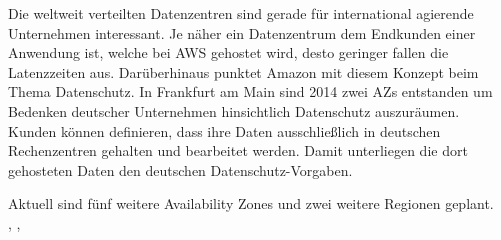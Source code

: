{Die weltweit verteilten Datenzentren sind gerade für international agierende Unternehmen interessant. Je näher ein Datenzentrum dem Endkunden einer Anwendung ist, welche bei AWS gehostet wird, desto geringer fallen die Latenzzeiten aus. Darüberhinaus punktet Amazon mit diesem Konzept beim Thema Datenschutz. In Frankfurt am Main sind 2014 zwei AZs entstanden um Bedenken deutscher Unternehmen hinsichtlich Datenschutz auszuräumen. Kunden können definieren, dass ihre Daten ausschließlich in deutschen Rechenzentren gehalten und bearbeitet werden. Damit unterliegen die dort gehosteten Daten den deutschen Datenschutz-Vorgaben.

Aktuell sind fünf weitere Availability Zones und zwei weitere Regionen geplant.
\\ \cite{computerwoche:reder}, \cite{aws:regions}, \cite{aws:azs}


}
